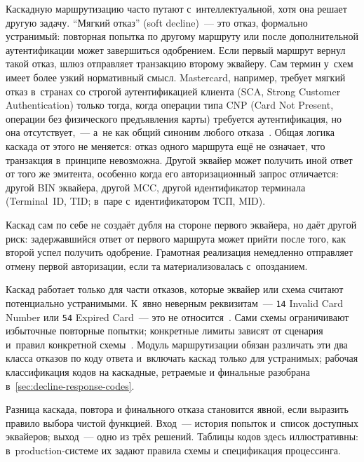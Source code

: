 Каскадную маршрутизацию часто путают с~интеллектуальной,
хотя она решает другую задачу. \enquote{Мягкий отказ} (soft decline)~---
это отказ, формально устранимый: повторная попытка по другому маршруту
или после дополнительной аутентификации может завершиться одобрением.
Если первый маршрут вернул такой отказ, шлюз
отправляет транзакцию второму эквайеру. Сам термин
у~схем имеет более узкий нормативный смысл. Mastercard, например,
требует мягкий отказ в~странах со строгой аутентификацией клиента
(SCA, Strong Customer Authentication) только тогда, когда
операции типа CNP (Card Not Present, операции без физического
предъявления карты) требуется аутентификация, но она
отсутствует,~--- а~не как общий синоним любого отказа~\cite{mc-tpr}.
Общая логика каскада от этого не меняется: отказ одного маршрута
ещё не означает, что транзакция в~принципе невозможна. Другой эквайер
может получить иной ответ от того же эмитента, особенно когда
его авторизационный запрос отличается: другой BIN эквайера,
другой MCC, другой идентификатор терминала (Terminal~ID, TID;
в~паре с~идентификатором ТСП, MID).


Каскад сам по себе не создаёт дубля на стороне первого эквайера,
но даёт другой риск: задержавшийся ответ от первого маршрута
может прийти после того, как второй успел получить одобрение.
Грамотная реализация немедленно отправляет отмену первой
авторизации, если та материализовалась с~опозданием.

Каскад работает только для части отказов, которые эквайер
или схема считают потенциально устранимыми. К~явно неверным
реквизитам~--- \texttt{14} Invalid Card Number или
\texttt{54} Expired Card~--- это не относится~\cite{mc-tpr}.
Сами схемы ограничивают избыточные повторные попытки; конкретные
лимиты зависят от сценария и~правил конкретной схемы~\cite{mc-tpr}.
Модуль маршрутизации обязан различать эти два класса отказов
по коду ответа и~включать каскад только для устранимых;
рабочая классификация кодов на каскадные, ретраемые и финальные
разобрана в~\ref{sec:decline-response-codes}.

Разница каскада, повтора и финального отказа становится явной,
если выразить правило выбора чистой функцией. Вход~--- история
попыток и~список доступных эквайеров; выход~--- одно из трёх
решений. Таблицы кодов здесь иллюстративны: в~production-системе
их задают правила схемы и спецификация процессинга.

